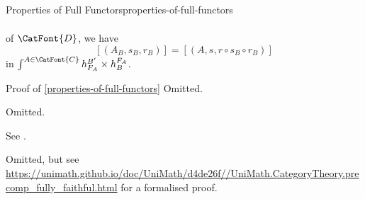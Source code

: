 \begin{proposition}{Properties of Full Functors}{properties-of-full-functors}
\begin{enumerate}
\begin{enumerate}
\begin{itemize}
\begin{align*}
                            \end{align*}
                            of $\CatFont{D}$, we have
                            \[
                                [(A_{B},s_{B},r_{B})]%
                                =%
                                [(A,s,r\circ s_{B}\circ r_{B})]%
                            \]%
                            in $\int^{A\in\CatFont{C}}h^{B'}_{F_{A}}\times h^{F_{A}}_{B}$.
                    \end{itemize}%
            \end{enumerate}
    \end{enumerate}
\end{proposition}
\begin{Proof}{Proof of \cref{properties-of-full-functors}}%
    Omitted.

    Omitted.

    See \cite[p.~47]{lectures-on-n-categories-and-cohomology}.

    Omitted, but see \url{https://unimath.github.io/doc/UniMath/d4de26f//UniMath.CategoryTheory.precomp\_fully\_faithful.html} for a formalised proof.


\end{Proof}

